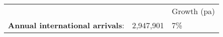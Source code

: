 \begin{tabular}[t]{p{4.8cm}>{\hfill}p{1.3cm}>{\hfill}p{1.4cm}}
   &   & Growth (pa) \\ 
 \textbf{Annual international arrivals}: & 2,947,901 & 7\% \\ 
  \end{tabular}
